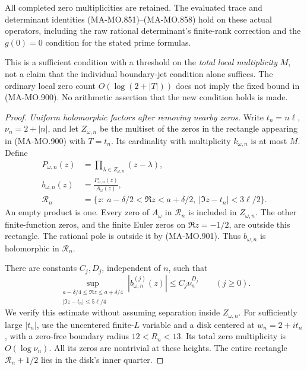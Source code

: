 All completed zero multiplicities are retained.
The evaluated trace and determinant identities
(MA-MO.851)--(MA-MO.858) hold on these actual
operators, including the raw rational determinant's
finite-rank correction and the \(g(0)=0\) condition
for the stated prime formulas.

This is a sufficient condition with a threshold on
the \emph{total local multiplicity} \(M\), not a
claim that the individual boundary-jet condition
alone suffices. The ordinary local zero count
\(O(\log(2+|T|))\) does not imply the fixed bound
in (MA-MO.900). No arithmetic assertion that the
new condition holds is made.

\begin{proof}
\emph{Uniform holomorphic factors after removing nearby zeros.}
Write \(t_n=n\ell\), \(\nu_n=2+|n|\), and let
\(Z_{\omega,n}\) be the multiset of the zeros in
the rectangle appearing in (MA-MO.900) with \(T=t_n\).
Its cardinality with multiplicity \(k_{\omega,n}\)
is at most \(M\). Define
\[
 \begin{aligned}
 P_{\omega,n}(z)&=\prod_{\lambda\in Z_{\omega,n}}(z-\lambda),\\
 b_{\omega,n}(z)&=\frac{P_{\omega,n}(z)}{A_\omega(z)},\\
 \mathcal R_n&=\{z:\ a-\delta/2<\Re z<a+\delta/2,\
                         |\Im z-t_n|<3\ell/2\}.
 \end{aligned}
 \tag{MA-MO.903}
\]
An empty product is one. Every zero of \(A_\omega\)
in \(\mathcal R_n\) is included in \(Z_{\omega,n}\).
The other finite-function zeros, and the finite Euler
zeros on \(\Re z=-1/2\), are outside this rectangle.
The rational pole is outside it by (MA-MO.901).
Thus \(b_{\omega,n}\) is holomorphic in \(\mathcal R_n\).

There are constants \(C_j,D_j\), independent of \(n\),
such that
\[
 \sup_{\substack{a-\delta/4\le\Re z\le a+\delta/4\\
                       |\Im z-t_n|\le5\ell/4}}
                   |b_{\omega,n}^{(j)}(z)|
                         \le C_j\nu_n^{D_j}
                         \qquad(j\ge0).
 \tag{MA-MO.904}
\]
We verify this estimate without assuming separation
inside \(Z_{\omega,n}\). For sufficiently large
\(|t_n|\), use the uncentered finite-\(L\) variable
and a disk centered at \(w_n=2+it_n\), with a
zero-free boundary radius \(12<R_n<13\).
Its total zero multiplicity is \(O(\log\nu_n)\).
All its zeros are nontrivial at these heights.
The entire rectangle \(\mathcal R_n+1/2\)
lies in the disk's inner quarter.


\end{proof}
